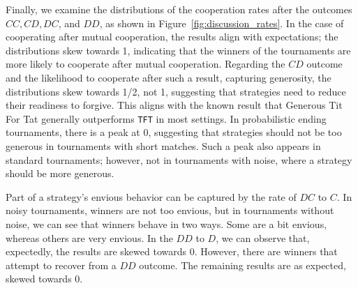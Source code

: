 \documentclass{article}
\def\TFT{\texttt{TFT}}
\begin{document}
Finally, we examine the distributions of the cooperation rates after the
outcomes \(CC, CD, DC\), and \(DD\), as shown in
Figure~\ref{fig:discussion_rates}. In the case of cooperating after mutual
cooperation, the results align with expectations; the distributions skew towards
1, indicating that the winners of the tournaments are more likely to cooperate
after mutual cooperation. Regarding the \(CD\) outcome and the likelihood to
cooperate after such a result, capturing generosity, the distributions skew
towards 1/2, not 1, suggesting that strategies need to reduce their readiness to
forgive. This aligns with the known result that Generous Tit For Tat generally
outperforms \TFT{} in most settings. In probabilistic ending tournaments, there
is a peak at 0, suggesting that strategies should not be too generous in
tournaments with short matches. Such a peak also appears in standard
tournaments; however, not in tournaments with noise, where a strategy should be
more generous.

Part of a strategy's envious behavior can be captured by the rate of \(DC\) to
\(C\). In noisy tournaments, winners are not too envious, but in tournaments
without noise, we can see that winners behave in two ways. Some are a bit
envious, whereas others are very envious. In the \(DD\) to \(D\), we can observe
that, expectedly, the results are skewed towards 0. However, there are winners
that attempt to recover from a \(DD\) outcome. The remaining results are as
expected, skewed towards 0.
\end{document}
